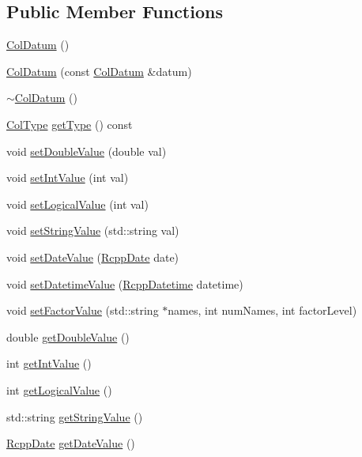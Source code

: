 \subsection*{Public Member Functions}
\begin{DoxyCompactItemize}
\item 
\hyperlink{classColDatum_ab0aa09b7e8d9acd2b0435b256c6b4da7}{ColDatum} ()
\item 
\hyperlink{classColDatum_a0507c6e2b4c76ee5364af001855fbe4e}{ColDatum} (const \hyperlink{classColDatum}{ColDatum} \&datum)
\item 
\hyperlink{classColDatum_accc1e3ec9da32643bd4953f983165b64}{$\sim$ColDatum} ()
\item 
\hyperlink{RcppFrame_8h_a3145f0ed02782c5b592881e0e8e53655}{ColType} \hyperlink{classColDatum_aae862d41617b3ae39f88b5b729ccccc3}{getType} () const 
\item 
void \hyperlink{classColDatum_aedf3ac3ea399222524f02f3468ec97a0}{setDoubleValue} (double val)
\item 
void \hyperlink{classColDatum_a80d401e1efb6e714113990c78e72eb84}{setIntValue} (int val)
\item 
void \hyperlink{classColDatum_a19ebd9c0e3e2544c8679999ab91c9e20}{setLogicalValue} (int val)
\item 
void \hyperlink{classColDatum_aa87060ae6c415167d501c41684d8a586}{setStringValue} (std::string val)
\item 
void \hyperlink{classColDatum_a988defa165f1d5ab7cde96d2c86c7c69}{setDateValue} (\hyperlink{classRcppDate}{RcppDate} date)
\item 
void \hyperlink{classColDatum_a5803eb7a89dc467b88d7d412462c6fb5}{setDatetimeValue} (\hyperlink{classRcppDatetime}{RcppDatetime} datetime)
\item 
void \hyperlink{classColDatum_abd6f582044692c2215d9cd4add379ea1}{setFactorValue} (std::string $\ast$names, int numNames, int factorLevel)
\item 
double \hyperlink{classColDatum_a6a19044be8ade2b14b372b179210a9bd}{getDoubleValue} ()
\item 
int \hyperlink{classColDatum_af498266608526c9db7f865bc66cc5e40}{getIntValue} ()
\item 
int \hyperlink{classColDatum_adf81b2aed6f8e19b6f36310288991f38}{getLogicalValue} ()
\item 
std::string \hyperlink{classColDatum_ad0d76d861441151f31cf42acff4b8c0f}{getStringValue} ()
\item 
\hyperlink{classRcppDate}{RcppDate} \hyperlink{classColDatum_a70480f53f9cee46bcdaed7331e38c943}{getDateValue} ()

\end{DoxyCompactItemize}
